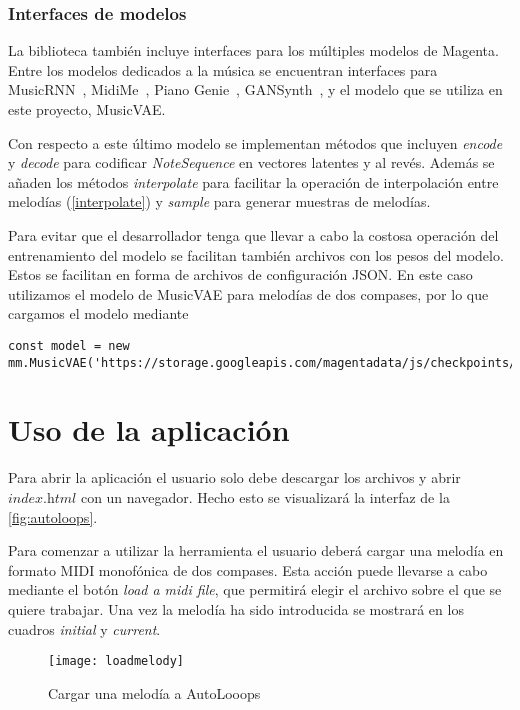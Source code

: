 \subsubsection{Interfaces de modelos}

La biblioteca también incluye interfaces para los múltiples modelos de Magenta. Entre los modelos dedicados a la música se encuentran interfaces para MusicRNN~\cite{performance-rnn-2017}, MidiMe~\cite{midime}, Piano Genie~\cite{pianogenie}, GANSynth~\cite{engel2019gansynth}, y el modelo que se utiliza en este proyecto, MusicVAE.

Con respecto a este último modelo se implementan métodos que incluyen \textit{encode} y \textit{decode} para codificar \textit{NoteSequence} en vectores latentes y al revés. Además se añaden los métodos \textit{interpolate} para facilitar la operación de interpolación entre melodías (\autoref{interpolate}) y \textit{sample} para generar muestras de melodías.

Para evitar que el desarrollador tenga que llevar a cabo la costosa operación del entrenamiento del modelo se facilitan también archivos con los pesos del modelo. Estos se facilitan en forma de archivos de configuración JSON. En este caso utilizamos el modelo de MusicVAE para melodías de dos compases, por lo que cargamos el modelo mediante

\begin{lstlisting}
const model = new mm.MusicVAE('https://storage.googleapis.com/magentadata/js/checkpoints/music_vae/mel_2bar_small');
\end{lstlisting}

\section{Uso de la aplicación}

Para abrir la aplicación el usuario solo debe descargar los archivos y abrir $\textit{index.html}$ con un navegador. Hecho esto se visualizará la interfaz de la  \autoref{fig:autoloops}.

Para comenzar a utilizar la herramienta el usuario deberá cargar una melodía en formato MIDI monofónica de dos compases. Esta acción puede llevarse a cabo mediante el botón \textit{load a midi file}, que permitirá elegir el archivo sobre el que se quiere trabajar. Una vez la melodía ha sido introducida se mostrará en los cuadros \textit{initial} y \textit{current}.

\begin{figure}[htpb]
  \centering
  \texttt{[image: loadmelody]}
  \caption{Cargar una melodía a AutoLooops}
  \label{fig:loadmelody}
\end{figure}


